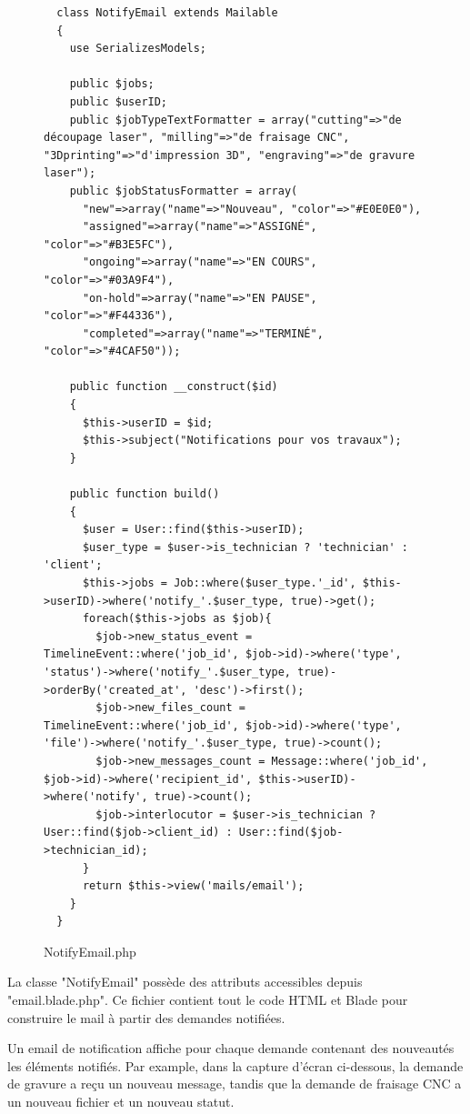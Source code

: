 \documentclass[
    iai, %
    eai, %
]{heig-tb}
\begin{document}
\begin{figure}[h]
  \begin{verbatim}
  class NotifyEmail extends Mailable
  {
    use SerializesModels;

    public $jobs;
    public $userID;
    public $jobTypeTextFormatter = array("cutting"=>"de découpage laser", "milling"=>"de fraisage CNC", "3Dprinting"=>"d'impression 3D", "engraving"=>"de gravure laser");
    public $jobStatusFormatter = array(
      "new"=>array("name"=>"Nouveau", "color"=>"#E0E0E0"),
      "assigned"=>array("name"=>"ASSIGNÉ", "color"=>"#B3E5FC"),
      "ongoing"=>array("name"=>"EN COURS", "color"=>"#03A9F4"),
      "on-hold"=>array("name"=>"EN PAUSE", "color"=>"#F44336"),
      "completed"=>array("name"=>"TERMINÉ", "color"=>"#4CAF50"));

    public function __construct($id)
    {
      $this->userID = $id;
      $this->subject("Notifications pour vos travaux");
    }

    public function build()
    {
      $user = User::find($this->userID);
      $user_type = $user->is_technician ? 'technician' : 'client';
      $this->jobs = Job::where($user_type.'_id', $this->userID)->where('notify_'.$user_type, true)->get();
      foreach($this->jobs as $job){
        $job->new_status_event = TimelineEvent::where('job_id', $job->id)->where('type', 'status')->where('notify_'.$user_type, true)->orderBy('created_at', 'desc')->first();
        $job->new_files_count = TimelineEvent::where('job_id', $job->id)->where('type', 'file')->where('notify_'.$user_type, true)->count();
        $job->new_messages_count = Message::where('job_id', $job->id)->where('recipient_id', $this->userID)->where('notify', true)->count();
        $job->interlocutor = $user->is_technician ? User::find($job->client_id) : User::find($job->technician_id);
      }
      return $this->view('mails/email');
    }
  }
  \end{verbatim}
  \caption{NotifyEmail.php}
\end{figure}

La classe "NotifyEmail" possède des attributs accessibles depuis "email.blade.php". Ce fichier contient tout le code HTML et Blade pour construire le mail à partir des demandes notifiées.

\newpage
Un email de notification affiche pour chaque demande contenant des nouveautés les éléments notifiés. Par example, dans la capture d'écran ci-dessous, la demande de gravure a reçu un nouveau message, tandis que la demande de fraisage CNC a un nouveau fichier et un nouveau statut.
\end{document}
